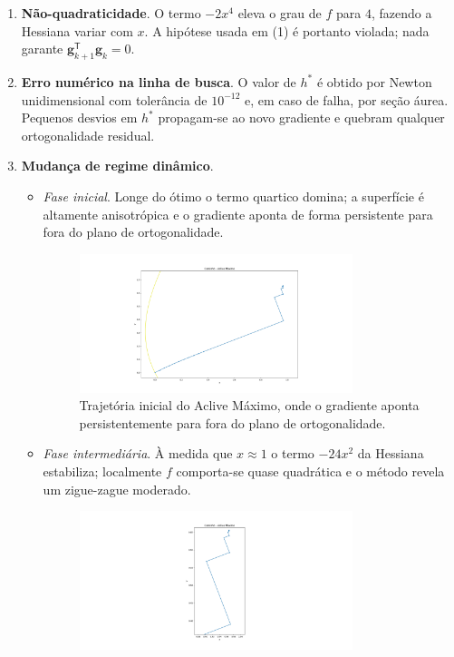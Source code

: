 \documentclass[12pt]{article}
\begin{document}
\begin{enumerate}
  \item \textbf{Não-quadraticidade}.  
        O termo \mbox{$-2x^{4}$} eleva o grau de $f$ para $4$, fazendo a Hessiana variar com $x$.
        A hipótese usada em (1) é portanto violada; nada garante $\mathbf{g}_{k+1}^{\mathsf T}\mathbf{g}_{k}=0$.
  \item \textbf{Erro numérico na linha de busca}.  
        O valor de $h^{\ast}$ é obtido por Newton unidimensional com tolerância de $10^{-12}$ e,
        em caso de falha, por seção áurea.  
        Pequenos desvios em $h^{\ast}$ propagam-se ao novo gradiente e quebram qualquer ortogonalidade residual.
  \item \textbf{Mudança de regime dinâmico}.  
        \begin{itemize}
          \item \emph{Fase inicial}.  Longe do ótimo o termo quartico domina; a superfície é altamente anisotrópica e o gradiente aponta de forma persistente para fora do plano de ortogonalidade.
                \begin{figure}[H]
            \centering
            \includegraphics[width=0.8\textwidth]{img/AM1.png}
            \caption{Trajetória inicial do Aclive Máximo, onde o gradiente aponta persistentemente para fora do plano de ortogonalidade.}
            \end{figure}
          \item \emph{Fase intermediária}.  À medida que $x\approx1$ o termo $-24x^{2}$ da Hessiana estabiliza; localmente $f$ comporta-se quase quadrática e o método revela um zigue-zague moderado.
                \begin{figure}[H]
                \centering
                \includegraphics[width=0.8\textwidth]{img/AM2.png}

\end{figure}
\end{itemize}
\end{enumerate}
\end{document}
